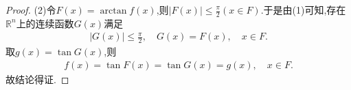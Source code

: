 \documentclass[../../main.tex]{subfiles}
\begin{document}
\begin{proof}
(2)令\(F(x)=\arctan f(x)\),则$|F(x)|\leqslant \frac{\pi}{2}(x\in F)$.于是由(1)可知,存在$\mathbb{R}^n$上的连续函数$G(x)$满足
\begin{align*}
|G(x)|\leqslant \frac{\pi}{2},\quad G(x)=F(x),\quad x\in F.
\end{align*}
取$g(x)=\tan G(x)$,则
\begin{align*}
f(x)=\tan F(x)=\tan G(x)=g(x),\quad x\in F.
\end{align*}
故结论得证.
\end{proof}
\end{document}
